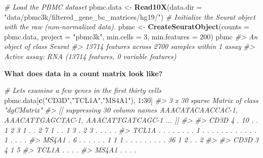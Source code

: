 \documentclass[
]{book}
\newenvironment{Shaded}{\begin{snugshade}}{\end{snugshade}}
\newcommand{\AttributeTok}[1]{\textcolor[rgb]{0.13,0.29,0.53}{#1}}
\newcommand{\CommentTok}[1]{\textcolor[rgb]{0.56,0.35,0.01}{\textit{#1}}}
\newcommand{\DecValTok}[1]{\textcolor[rgb]{0.00,0.00,0.81}{#1}}
\newcommand{\FunctionTok}[1]{\textcolor[rgb]{0.13,0.29,0.53}{\textbf{#1}}}
\newcommand{\NormalTok}[1]{#1}
\newcommand{\OtherTok}[1]{\textcolor[rgb]{0.56,0.35,0.01}{#1}}
\newcommand{\SpecialCharTok}[1]{\textcolor[rgb]{0.81,0.36,0.00}{\textbf{#1}}}
\newcommand{\StringTok}[1]{\textcolor[rgb]{0.31,0.60,0.02}{#1}}
\begin{document}
\begin{Shaded}
\begin{Highlighting}[]
\CommentTok{\# Load the PBMC dataset}
\NormalTok{pbmc.data }\OtherTok{\textless{}{-}} \FunctionTok{Read10X}\NormalTok{(}\AttributeTok{data.dir =} \StringTok{"data/pbmc3k/filtered\_gene\_bc\_matrices/hg19/"}\NormalTok{)}
\CommentTok{\# Initialize the Seurat object with the raw (non{-}normalized data).}
\NormalTok{pbmc }\OtherTok{\textless{}{-}} \FunctionTok{CreateSeuratObject}\NormalTok{(}\AttributeTok{counts =}\NormalTok{ pbmc.data, }\AttributeTok{project =} \StringTok{"pbmc3k"}\NormalTok{, }\AttributeTok{min.cells =} \DecValTok{3}\NormalTok{, }\AttributeTok{min.features =} \DecValTok{200}\NormalTok{)}
\NormalTok{pbmc}
\CommentTok{\#\textgreater{} An object of class Seurat }
\CommentTok{\#\textgreater{} 13714 features across 2700 samples within 1 assay }
\CommentTok{\#\textgreater{} Active assay: RNA (13714 features, 0 variable features)}
\end{Highlighting}
\end{Shaded}

\textbf{What does data in a count matrix look like?}

\begin{Shaded}
\begin{Highlighting}[]
\CommentTok{\# Lets examine a few genes in the first thirty cells}
\NormalTok{pbmc.data[}\FunctionTok{c}\NormalTok{(}\StringTok{"CD3D"}\NormalTok{,}\StringTok{"TCL1A"}\NormalTok{,}\StringTok{"MS4A1"}\NormalTok{), }\DecValTok{1}\SpecialCharTok{:}\DecValTok{30}\NormalTok{]}
\CommentTok{\#\textgreater{} 3 x 30 sparse Matrix of class "dgCMatrix"}
\CommentTok{\#\textgreater{}   [[ suppressing 30 column names \textquotesingle{}AAACATACAACCAC{-}1\textquotesingle{}, \textquotesingle{}AAACATTGAGCTAC{-}1\textquotesingle{}, \textquotesingle{}AAACATTGATCAGC{-}1\textquotesingle{} ... ]]}
\CommentTok{\#\textgreater{}                                                            }
\CommentTok{\#\textgreater{} CD3D  4 . 10 . . 1 2 3 1 . . 2 7 1 . . 1 3 . 2  3 . . . . .}
\CommentTok{\#\textgreater{} TCL1A . .  . . . . . . 1 . . . . . . . . . . .  . 1 . . . .}
\CommentTok{\#\textgreater{} MS4A1 . 6  . . . . . . 1 1 1 . . . . . . . . . 36 1 2 . . 2}
\CommentTok{\#\textgreater{}              }
\CommentTok{\#\textgreater{} CD3D  3 4 1 5}
\CommentTok{\#\textgreater{} TCL1A . . . .}
\CommentTok{\#\textgreater{} MS4A1 . . . .}
\end{Highlighting}
\end{Shaded}
\end{document}
